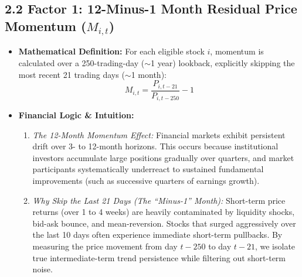 \documentclass[11pt,a4paper]{article}
\begin{document}
\subsection{2.2 Factor 1: 12-Minus-1 Month Residual Price Momentum ($M_{i,t}$)}
\begin{itemize}[leftmargin=1.5em]
    \item \textbf{Mathematical Definition:} For each eligible stock $i$, momentum is calculated over a 250-trading-day ($\sim$1 year) lookback, explicitly skipping the most recent 21 trading days ($\sim$1 month):
    \begin{equation}
        M_{i, t} = \frac{P_{i, t-21}}{P_{i, t-250}} - 1
    \end{equation}
    \item \textbf{Financial Logic \& Intuition:} 
    \begin{enumerate}[label=(\alph*), itemsep=0.1em]
        \item \textit{The 12-Month Momentum Effect:} Financial markets exhibit persistent drift over 3- to 12-month horizons. This occurs because institutional investors accumulate large positions gradually over quarters, and market participants systematically underreact to sustained fundamental improvements (such as successive quarters of earnings growth).
        \item \textit{Why Skip the Last 21 Days (The ``Minus-1'' Month):} Short-term price returns (over 1 to 4 weeks) are heavily contaminated by liquidity shocks, bid-ask bounce, and mean-reversion. Stocks that surged aggressively over the last 10 days often experience immediate short-term pullbacks. By measuring the price movement from day $t-250$ to day $t-21$, we isolate true intermediate-term trend persistence while filtering out short-term noise.
    \end{enumerate}
\end{itemize}
\end{document}
